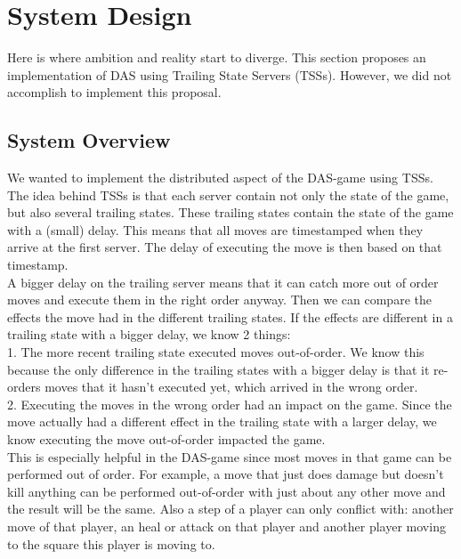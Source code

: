 \section{System Design}
\label{chap:sysdesign}
Here is where ambition and reality start to diverge. This section proposes an implementation of DAS using Trailing State Servers (TSSs). However, we did not accomplish to implement this proposal.

\subsection{System Overview}
We wanted to implement the distributed aspect of the DAS-game using TSSs. The idea behind TSSs is that each server contain not only the state of the game, but also several trailing states. These trailing states contain the state of the game with a (small) delay. This means that all moves are timestamped when they arrive at the first server. The delay of executing the move is then based on that timestamp.\\
A bigger delay on the trailing server means that it can catch more out of order moves and execute them in the right order anyway. Then we can compare the effects the move had in the different trailing states. If the effects are different in a trailing state with a bigger delay, we know 2 things:\\
1. The more recent trailing state executed moves out-of-order. We know this because the only difference in the trailing states with a bigger delay is that it re-orders moves that it hasn't executed yet, which arrived in the wrong order. \\
2. Executing the moves in the wrong order had an impact on the game. Since the move actually had a different effect in the trailing state with a larger delay, we know executing the move out-of-order impacted the game.\\
This is especially helpful in the DAS-game since most moves in that game can be performed out of order. For example, a move that just does damage but doesn't kill anything can be performed out-of-order with just about any other move and the result will be the same. Also a step of a player can only conflict with: another move of that player, an heal or attack on that player and another player moving to the square this player is moving to.\\
